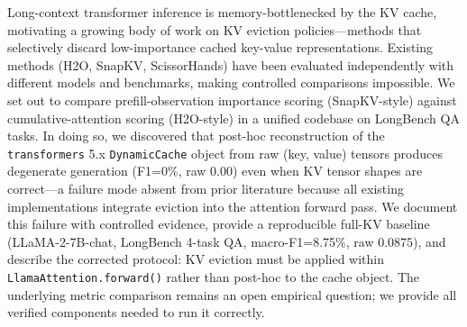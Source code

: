 Long-context transformer inference is memory-bottlenecked by the KV cache, motivating a growing body of work on KV eviction policies---methods that selectively discard low-importance cached key-value representations. Existing methods (H2O, SnapKV, ScissorHands) have been evaluated independently with different models and benchmarks, making controlled comparisons impossible. We set out to compare prefill-observation importance scoring (SnapKV-style) against cumulative-attention scoring (H2O-style) in a unified codebase on LongBench QA tasks. In doing so, we discovered that post-hoc reconstruction of the \texttt{transformers} 5.x \texttt{DynamicCache} object from raw (key, value) tensors produces degenerate generation (F1=0\%, raw 0.00) even when KV tensor shapes are correct---a failure mode absent from prior literature because all existing implementations integrate eviction into the attention forward pass. We document this failure with controlled evidence, provide a reproducible full-KV baseline (LLaMA-2-7B-chat, LongBench 4-task QA, macro-F1=8.75\%, raw 0.0875), and describe the corrected protocol: KV eviction must be applied within \texttt{LlamaAttention.forward()} rather than post-hoc to the cache object. The underlying metric comparison remains an open empirical question; we provide all verified components needed to run it correctly.
